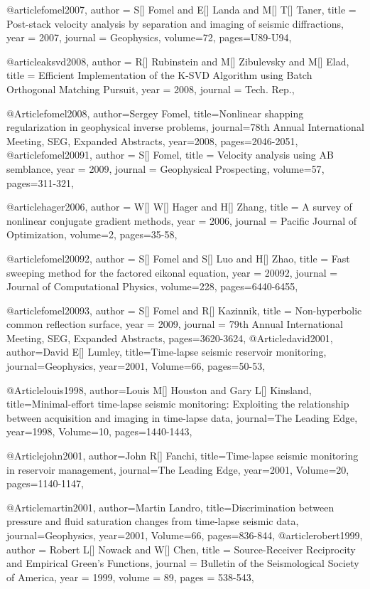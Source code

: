 @article{fomel2007,
  author =	 {S[] Fomel and E[] Landa and M[] T[] Taner},
  title =	 {Post-stack velocity analysis by separation and imaging of seismic diffractions},
  year =	 2007,
  journal =	 {Geophysics},
  volume={72},
 pages=U89-U94,
}

@article{aksvd2008,
  author =	 {R[] Rubinstein and M[] Zibulevsky and M[] Elad},
  title =	 {Efficient Implementation of the {K-SVD} Algorithm using Batch Orthogonal Matching Pursuit},
  year =	 2008,
  journal =	 {Tech. Rep.},
}

@Article{fomel2008,
  author={Sergey Fomel},
  title={Nonlinear shapping regularization in geophysical inverse problems},
  journal={78th Annual International Meeting, SEG, Expanded Abstracts},
  year=2008,
  pages={2046-2051},
}
@article{fomel20091,
  author =	 {S[] Fomel},
  title =	 {Velocity analysis using {AB} semblance},
  year =	 2009,
  journal =	 {Geophysical Prospecting},
  volume={57},
 pages=311-321,
}

@article{hager2006,
  author =	 {W[] W[] Hager and H[] Zhang},
  title =	 {A survey of nonlinear conjugate gradient methods},
  year =	 2006,
  journal =	 {Pacific Journal of Optimization},
  volume={2},
 pages=35-58,
}

@article{fomel20092,
  author =	 {S[] Fomel and S[] Luo and H[] Zhao},
  title =	 {Fast sweeping method for the factored eikonal equation},
  year =	 20092,
  journal =	 {Journal of Computational Physics},
  volume={228},
 pages=6440-6455,
}

@article{fomel20093,
  author =	 {S[] Fomel and R[] Kazinnik},
  title =	 {Non-hyperbolic common reflection surface},
  year =	 2009,
  journal =	 {79th Annual International Meeting, SEG, Expanded Abstracts},
 pages=3620-3624,
}
@Article{david2001,
  author={David E[] Lumley},
  title={Time-lapse seismic reservoir monitoring},
  journal={Geophysics},
  year=2001,
  Volume=66,
  pages={50-53},
}

@Article{louis1998,
  author={Louis M[] Houston and Gary L[] Kinsland},
  title={Minimal-effort time-lapse seismic monitoring: Exploiting the relationship between acquisition and imaging in time-lapse data},
  journal={The Leading Edge},
  year=1998,
  Volume=10,
  pages={1440-1443},
}

@Article{john2001,
  author={John R[] Fanchi},
  title={Time-lapse seismic monitoring in reservoir management},
  journal={The Leading Edge},
  year=2001,
  Volume=20,
  pages={1140-1147},
}

@Article{martin2001,
  author={Martin Landro},
  title={Discrimination between pressure and fluid saturation changes from time‐lapse seismic data},
  journal={Geophysics},
  year=2001,
  Volume=66,
  pages={836-844},
}
@article{robert1999,
  author =	 {Robert L[] Nowack and W[] Chen},
  title =	 {Source-Receiver Reciprocity and Empirical {G}reen's Functions},
  journal = 	 {Bulletin of the Seismological Society of America},
  year = 	 1999,
  volume =	 89,
  pages =	 {538-543},
}

